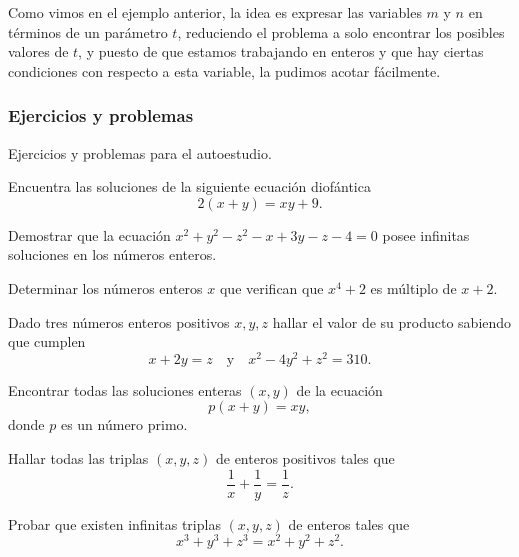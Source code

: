 Como vimos en el ejemplo anterior, la idea es expresar las variables $m$ y $n$ en términos de un parámetro $t$,
reduciendo el problema a solo encontrar los posibles valores de $t$, y puesto de que estamos trabajando en enteros
y que hay ciertas condiciones con respecto a esta variable, la pudimos acotar fácilmente.

\subsubsection{Ejercicios y problemas}

Ejercicios y problemas para el autoestudio.

\begin{exercise}
    Encuentra las soluciones de la siguiente ecuación diofántica
    \[
        2(x + y) = xy + 9.
    \]
\end{exercise}

\begin{exercise}
    Demostrar que la ecuación $x^2 + y^2 - z^2 - x + 3y - z - 4 = 0$ posee infinitas soluciones en los números enteros.
\end{exercise}

\begin{exercise}
    Determinar los números enteros $x$ que verifican que $x^4 + 2$ es múltiplo de $x + 2$.
\end{exercise}

\begin{exercise}
    Dado tres números enteros positivos $x,y,z$ hallar el valor de su producto sabiendo que cumplen
    \[
        x + 2y = z \quad \text{y} \quad x^2 - 4y^2 + z^2 = 310.
    \]
\end{exercise}

\begin{exercise}
    Encontrar todas las soluciones enteras $(x,y)$ de la ecuación
    \[
        p(x + y) = xy,
    \]
    donde $p$ es un número primo.
\end{exercise}

\begin{exercise}
    Hallar todas las triplas $(x,y,z)$ de enteros positivos tales que
    \[
        \frac{1}{x} + \frac{1}{y} = \frac{1}{z}.
    \]
\end{exercise}

\begin{exercise}
    Probar que existen infinitas triplas $(x,y,z)$ de enteros tales que
    \[
        x^3 + y^3 + z^3 = x^2 + y^2 + z^2.
    \]
\end{exercise}

